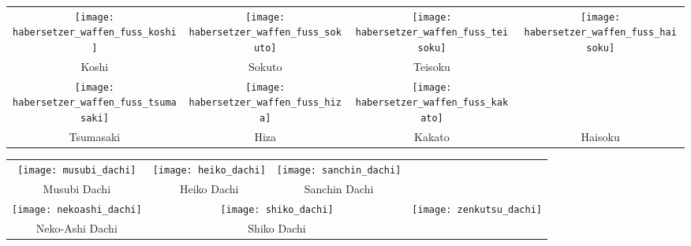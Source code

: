 \clearpage
\pagebreak
\setcounter{num}{0}
\setcounter{numz}{0}
\begin{tcolorbox}[width=\textwidth,height=\textheight,right=12pt,left=12pt,colframe=GKD,colback=white,fonttitle=\bfseries,coltitle=white,title=Allgemeines:\indent Körperwaffen]
	\null\vfill\null	
	\begin{tabularx}{\textwidth}{cccc}
		\texttt{[image: habersetzer\_waffen\_fuss\_koshi]} 		& \texttt{[image: habersetzer\_waffen\_fuss\_sokuto]} 		& \texttt{[image: habersetzer\_waffen\_fuss\_teisoku]} &
		\multirow{3}{*}{\texttt{[image: habersetzer\_waffen\_fuss\_haisoku]}}
		\\
		Koshi 		& Sokuto 	& Teisoku &\\
		\texttt{[image: habersetzer\_waffen\_fuss\_tsumasaki]} 	& \texttt{[image: habersetzer\_waffen\_fuss\_hiza]} 		&  \texttt{[image: habersetzer\_waffen\_fuss\_kakato]} &\\
		Tsumasaki 	& Hiza 		& Kakato & Haisoku\\
	\end{tabularx}
	\null\vfill\null
\end{tcolorbox}
\clearpage
\pagebreak
\begin{tcolorbox}[width=\textwidth,height=\textheight,right=12pt,left=12pt,colframe=GKD,colback=white,fonttitle=\bfseries,coltitle=white,title=Allgemeines:\indent Grundlegende Dachi Waza]
	\null\vfill\null
	\setcounter{num}{0}
	\setcounter{numz}{0}	
	\begin{tabularx}{\textwidth}{cccc}
		\texttt{[image: musubi\_dachi]}	&
		\texttt{[image: heiko\_dachi]} &
		\texttt{[image: sanchin\_dachi]} & \\
		Musubi Dachi 		& Heiko Dachi 	& Sanchin Dachi & \\
		\texttt{[image: nekoashi\_dachi]} & \multicolumn{2}{c}{\texttt{[image: shiko\_dachi]}} &
		\multirow[t]{3}{*}{\texttt{[image: zenkutsu\_dachi]}}\\
		Neko-Ashi Dachi 	& \multicolumn{2}{c}{Shiko Dachi} 	& Zenkutsu Dachi  \\							
	\end{tabularx}\\\null\vfill\null
\end{tcolorbox}
\clearpage
\pagebreak
